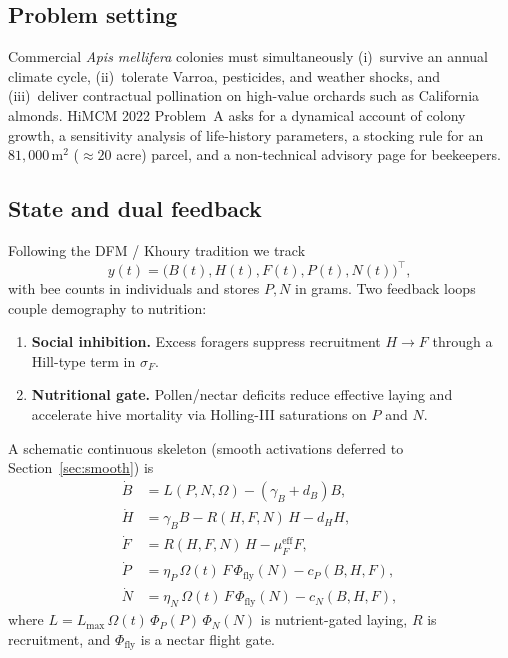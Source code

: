 \documentclass[12pt]{article}
\newcommand{\Lmax}{L_{\max}}
\newcommand{\muF}{\mu_{F}}
\newcommand{\etaN}{\eta_{N}}
\newcommand{\etaP}{\eta_{P}}
\newcommand{\sigF}{\sigma_{F}}
\begin{document}
\subsection{Problem setting}
Commercial \emph{Apis mellifera} colonies must simultaneously (i)~survive
an annual climate cycle, (ii)~tolerate Varroa, pesticides, and weather
shocks, and (iii)~deliver contractual pollination on high-value orchards
such as California almonds. HiMCM 2022 Problem~A asks for a dynamical
account of colony growth, a sensitivity analysis of life-history
parameters, a stocking rule for an \(81{,}000\,\mathrm{m}^2\)
(\(\approx 20\) acre) parcel, and a non-technical advisory page for
beekeepers.

\subsection{State and dual feedback}
Following the DFM / Khoury tradition we track
\begin{equation}
  y(t)=\bigl(B(t),H(t),F(t),P(t),N(t)\bigr)^\top,
\end{equation}
with bee counts in individuals and stores \(P,N\) in grams. Two feedback
loops couple demography to nutrition:
\begin{enumerate}[leftmargin=1.4em]
  \item \textbf{Social inhibition.} Excess foragers suppress recruitment
        \(H\to F\) through a Hill-type term in \(\sigF\).
  \item \textbf{Nutritional gate.} Pollen/nectar deficits reduce effective
        laying and accelerate hive mortality via Holling-III saturations
        on \(P\) and \(N\).
\end{enumerate}

A schematic continuous skeleton (smooth activations deferred to
Section~\ref{sec:smooth}) is
\begin{align}
  \dot B &= L(P,N,\Omega) - (\gamma_B+d_B)B,\\
  \dot H &= \gamma_B B - R(H,F,N)\,H - d_H H,\\
  \dot F &= R(H,F,N)\,H - \muF^{\mathrm{eff}} F,\\
  \dot P &= \etaP\,\Omega(t)\,F\,\Phi_{\mathrm{fly}}(N) - c_P(B,H,F),\\
  \dot N &= \etaN\,\Omega(t)\,F\,\Phi_{\mathrm{fly}}(N) - c_N(B,H,F),
\end{align}
where \(L=\Lmax\,\Omega(t)\,\Phi_P(P)\,\Phi_N(N)\) is nutrient-gated laying,
\(R\) is recruitment, and \(\Phi_{\mathrm{fly}}\) is a nectar flight gate.
\end{document}
